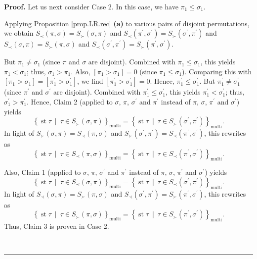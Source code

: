 \documentclass[numbers=enddot,12pt,final,onecolumn,notitlepage]{scrartcl}%
\theoremstyle{definition}
\newenvironment{proof}[1][Proof]{\noindent\textbf{#1.} }{\ \rule{0.5em}{0.5em}}
\newenvironment{verlong}{}{}
\begin{document}
\begin{verlong}
\begin{proof}
Let us next consider Case 2. In this case, we have $\pi_{1}\leq\sigma_{1}$.

Applying Proposition \ref{prop.LR.rec} \textbf{(a)} to various pairs of
disjoint permutations, we obtain $S_{\prec}\left(  \pi,\sigma\right)
=S_{\succ}\left(  \sigma,\pi\right)  $ and $S_{\prec}\left(  \pi^{\prime
},\sigma^{\prime}\right)  =S_{\succ}\left(  \sigma^{\prime},\pi^{\prime
}\right)  $ and $S_{\prec}\left(  \sigma,\pi\right)  =S_{\succ}\left(
\pi,\sigma\right)  $ and $S_{\prec}\left(  \sigma^{\prime},\pi^{\prime
}\right)  =S_{\succ}\left(  \pi^{\prime},\sigma^{\prime}\right)  $.

But $\pi_{1}\neq\sigma_{1}$ (since $\pi$ and $\sigma$ are disjoint). Combined
with $\pi_{1}\leq\sigma_{1}$, this yields $\pi_{1}<\sigma_{1}$; thus,
$\sigma_{1}>\pi_{1}$. Also, $\left[  \pi_{1}>\sigma_{1}\right]  =0$ (since
$\pi_{1}\leq\sigma_{1}$). Comparing this with $\left[  \pi_{1}>\sigma
_{1}\right]  =\left[  \pi_{1}^{\prime}>\sigma_{1}^{\prime}\right]  $, we find
$\left[  \pi_{1}^{\prime}>\sigma_{1}^{\prime}\right]  =0$. Hence, $\pi
_{1}^{\prime}\leq\sigma_{1}^{\prime}$. But $\pi_{1}^{\prime}\neq\sigma
_{1}^{\prime}$ (since $\pi^{\prime}$ and $\sigma^{\prime}$ are disjoint).
Combined with $\pi_{1}^{\prime}\leq\sigma_{1}^{\prime}$, this yields $\pi
_{1}^{\prime}<\sigma_{1}^{\prime}$; thus, $\sigma_{1}^{\prime}>\pi_{1}%
^{\prime}$. Hence, Claim 2 (applied to $\sigma$, $\pi$, $\sigma^{\prime}$ and
$\pi^{\prime}$ instead of $\pi$, $\sigma$, $\pi^{\prime}$ and $\sigma^{\prime
}$) yields%
\[
\left\{  \operatorname{st} \tau   \ \mid\ \tau\in S_{\succ
}\left(  \sigma,\pi\right)  \right\}  _{\operatorname*{multi}}=\left\{
\operatorname{st} \tau   \ \mid\ \tau\in S_{\succ}\left(
\sigma^{\prime},\pi^{\prime}\right)  \right\}  _{\operatorname*{multi}}.
\]
In light of $S_{\succ}\left(  \sigma,\pi\right)  =S_{\prec}\left(  \pi
,\sigma\right)  $ and $S_{\succ}\left(  \sigma^{\prime},\pi^{\prime}\right)
=S_{\prec}\left(  \pi^{\prime},\sigma^{\prime}\right)  $, this rewrites as
\[
\left\{  \operatorname{st} \tau   \ \mid\ \tau\in S_{\prec
}\left(  \pi,\sigma\right)  \right\}  _{\operatorname*{multi}}=\left\{
\operatorname{st} \tau   \ \mid\ \tau\in S_{\prec}\left(
\pi^{\prime},\sigma^{\prime}\right)  \right\}  _{\operatorname*{multi}}.
\]


Also, Claim 1 (applied to $\sigma$, $\pi$, $\sigma^{\prime}$ and $\pi^{\prime
}$ instead of $\pi$, $\sigma$, $\pi^{\prime}$ and $\sigma^{\prime}$) yields%
\[
\left\{  \operatorname{st} \tau   \ \mid\ \tau\in S_{\prec
}\left(  \sigma,\pi\right)  \right\}  _{\operatorname*{multi}}=\left\{
\operatorname{st} \tau   \ \mid\ \tau\in S_{\prec}\left(
\sigma^{\prime},\pi^{\prime}\right)  \right\}  _{\operatorname*{multi}}.
\]
In light of $S_{\prec}\left(  \sigma,\pi\right)  =S_{\succ}\left(  \pi
,\sigma\right)  $ and $S_{\prec}\left(  \sigma^{\prime},\pi^{\prime}\right)
=S_{\succ}\left(  \pi^{\prime},\sigma^{\prime}\right)  $, this rewrites as%
\[
\left\{  \operatorname{st} \tau   \ \mid\ \tau\in S_{\succ
}\left(  \pi,\sigma\right)  \right\}  _{\operatorname*{multi}}=\left\{
\operatorname{st} \tau   \ \mid\ \tau\in S_{\succ}\left(
\pi^{\prime},\sigma^{\prime}\right)  \right\}  _{\operatorname*{multi}}.
\]
Thus, Claim 3 is proven in Case 2.


\end{proof}
\end{verlong}
\end{document}
